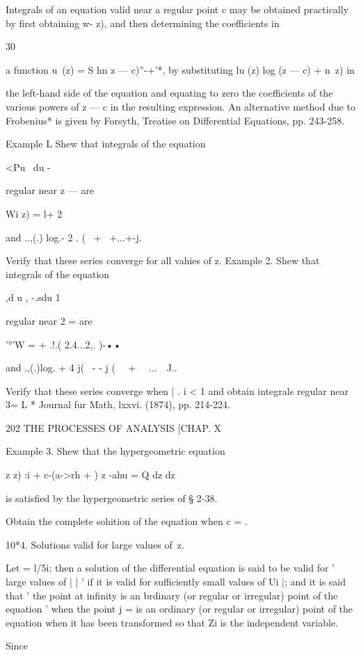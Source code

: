 Integrals of an equation valid near a regular point c may be obtained
practically by first obtaining w- z), and then determining the
coefficients in

30

a function u\ (z) = S hn z — c)''-+'*, by substituting lu (z) log (z —
c) + n\ z) in

the left-hand side of the equation and equating to zero the
coefficients of the various powers of z — c in the resulting
expression. An alternative method due to Frobenius* is given by
Forsyth, Treatise on Differential Equations, pp. 243-258.

Example L Shew that integrals of the equation

<Pu \ du -

regular near z — are

Wi z) = l+ 2

and ..,(.) log.- 2 . ( \ + \ +...+-j.

Verify that these series converge for all vahies of z. Example 2. Shew
that integrals of the equation

 ,d u , -.sdu 1

regular near 2 = are

'°'W = + .!.( 2.4...2,. )-••

and .,(.)log. + 4 j( \ - - j ( \ \ + \ \ ...\ \ J..

Verify that these series converge when | . i < 1 and obtain integrals
regular near 3= L * Journal fur Math, lxxvi. (1874), pp. 214-224.

202 THE PROCESSES OF ANALYSIS [CHAP. X

Example 3. Shew that the hypergeometric equation

z z) :i + c-(a->rh + ) z -ahu = Q dz dz

is satisfied by the hypergeometric series of § 2-38.

Obtain the complete sohition of the equation when c = .

10*4. Solutions valid for large values of\ z.

Let = l/5i; then a solution of the differential equation is said to be
valid for ' large values of | | ' if it is valid for sufficiently
small values of Ui |; and it is said that ' the point at infinity is
an brdinary (or regular or irregular) point of the equation ' when the
point j = is an ordinary (or regular or irregular) point of the
equation when it has been transformed so that Zi is the independent
variable.

Since

